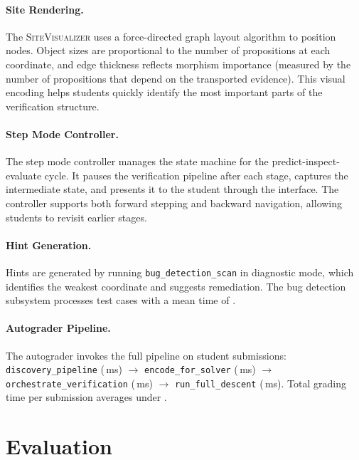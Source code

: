 \documentclass[11pt]{article}
\newcommand{\SiteViz}{\textsc{SiteVisualizer}}
\begin{document}
\paragraph{Site Rendering.}
The \SiteViz{} uses a force-directed graph layout algorithm to position
nodes. Object sizes are proportional to the number of propositions at each
coordinate, and edge thickness reflects morphism importance (measured by
the number of propositions that depend on the transported evidence). This
visual encoding helps students quickly identify the most important parts
of the verification structure.

\paragraph{Step Mode Controller.}
The step mode controller manages the state machine for the
predict-inspect-evaluate cycle. It pauses the verification pipeline after
each stage, captures the intermediate state, and presents it to the student
through the interface. The controller supports both forward stepping and
backward navigation, allowing students to revisit earlier stages.

\paragraph{Hint Generation.}
Hints are generated by running \texttt{bug\_detection\_scan} in diagnostic
mode, which identifies the weakest coordinate and suggests remediation.
The bug detection subsystem processes \compBuggyCount{} test cases with a
mean time of \compBuggyMeanTime{}.

\paragraph{Autograder Pipeline.}
The autograder invokes the full \JuGeo{} pipeline on student submissions:
\texttt{discovery\_pipeline} (\compProfDiscoveryPipelineMeanMs{}\,ms) $\to$
\texttt{encode\_for\_solver} (\compProfEncodeForSolverMeanMs{}\,ms) $\to$
\texttt{orchestrate\_verification}
(\compProfOrchestrateVerificationMeanMs{}\,ms) $\to$
\texttt{run\_full\_descent} (\compProfRunFullDescentMeanMs{}\,ms).
Total grading time per submission averages under \expTimeMean{}.

\section{Evaluation}\label{sec:evaluation}
\end{document}
